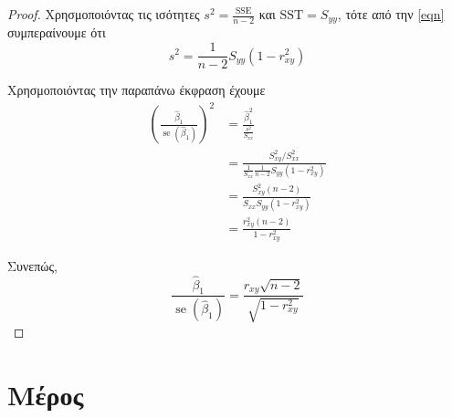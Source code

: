 \documentclass{article}
\DeclareMathOperator{\se}{\mathrm{se}}
\newcommand{\SSE}{\mathrm{SSE}}
\newcommand{\SST}{\mathrm{SST}}
\newcommand{\hb}{\hat{\beta}}
\begin{document}
\begin{proof}
    Χρησμοποιόντας τις ισότητες \(s^2 = \frac{\SSE}{n-2}\) και \(\SST = S_{yy}\), τότε από την \eqref{eqn} συμπεραίνουμε ότι
    \begin{equation*}
        s^2 = \frac{1}{n-2} S_{yy} \left( 1 - r_{xy}^2 \right)
    \end{equation*}

    Χρησμοποιόντας την παραπάνω έκφραση έχουμε
    \begin{equation*}
        \begin{split}
            \left( \frac{\hb_1}{\se(\hb_1)} \right)^2 &= \frac{\hb_1^2}{\frac{s^2}{S_{xx}}}\\
            &= \frac{S_{xy}^2 / S_{xx}^2}{\frac{1}{S_{xx}}  \frac{1}{n-2} S_{yy} \left( 1 - r_{xy}^2 \right)}\\
            &= \frac{S_{xy}^2 (n-2)}{S_{xx} S_{yy} \left( 1 - r_{xy}^{2} \right)}\\
            &= \frac{r_{xy}^2 (n-2)}{1 - r_{xy}^2}
        \end{split}
    \end{equation*}

    Συνεπώς,
    \begin{equation*}
        \frac{\hb_1}{\se(\hb_1)} = \frac{r_{xy} \sqrt{n-2}}{\sqrt{1 - r_{xy}^2}}
    \end{equation*}
\end{proof}


\section{Μέρος}
\end{document}
